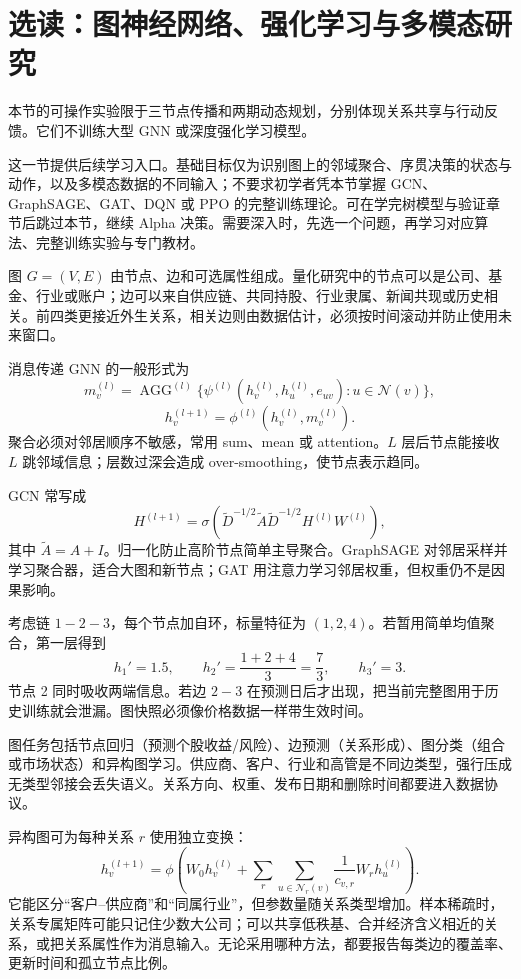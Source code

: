 \section{选读：图神经网络、强化学习与多模态研究}
\label{ch:lower-ml-frontiers}

本节的可操作实验限于三节点传播和两期动态规划，分别体现关系共享与行动反馈。它们不训练大型 GNN 或深度强化学习模型。


这一节提供后续学习入口。基础目标仅为识别图上的邻域聚合、序贯决策的状态与动作，以及多模态数据的不同输入；不要求初学者凭本节掌握 GCN、GraphSAGE、GAT、DQN 或 PPO 的完整训练理论。可在学完树模型与验证章节后跳过本节，继续 Alpha 决策。需要深入时，先选一个问题，再学习对应算法、完整训练实验与专门教材。


图 $G=(V,E)$ 由节点、边和可选属性组成。量化研究中的节点可以是公司、基金、行业或账户；边可以来自供应链、共同持股、行业隶属、新闻共现或历史相关。前四类更接近外生关系，相关边则由数据估计，必须按时间滚动并防止使用未来窗口。



消息传递 GNN 的一般形式为
\[
m_v^{(l)}=\operatorname{AGG}^{(l)}
\{\psi^{(l)}(h_v^{(l)},h_u^{(l)},e_{uv}):u\in\mathcal N(v)\},
\]
\[
h_v^{(l+1)}=\phi^{(l)}(h_v^{(l)},m_v^{(l)}).
\]
聚合必须对邻居顺序不敏感，常用 sum、mean 或 attention。$L$ 层后节点能接收 $L$ 跳邻域信息；层数过深会造成 over-smoothing，使节点表示趋同。


GCN 常写成
\[
H^{(l+1)}=\sigma\!\left(
\tilde D^{-1/2}\tilde A\tilde D^{-1/2}H^{(l)}W^{(l)}
\right),
\]
其中 $\tilde A=A+I$。归一化防止高阶节点简单主导聚合。GraphSAGE 对邻居采样并学习聚合器，适合大图和新节点；GAT 用注意力学习邻居权重，但权重仍不是因果影响。


考虑链 $1-2-3$，每个节点加自环，标量特征为 $(1,2,4)$。若暂用简单均值聚合，第一层得到
\[
h_1'=1.5,\qquad h_2'=\frac{1+2+4}{3}=\frac73,
\qquad h_3'=3.
\]
节点 2 同时吸收两端信息。若边 $2-3$ 在预测日后才出现，把当前完整图用于历史训练就会泄漏。图快照必须像价格数据一样带生效时间。

图任务包括节点回归（预测个股收益/风险）、边预测（关系形成）、图分类（组合或市场状态）和异构图学习。供应商、客户、行业和高管是不同边类型，强行压成无类型邻接会丢失语义。关系方向、权重、发布日期和删除时间都要进入数据协议。

异构图可为每种关系 $r$ 使用独立变换：
\[
h_v^{(l+1)}=\phi\!\left(
W_0h_v^{(l)}+\sum_r\sum_{u\in\mathcal N_r(v)}
\frac{1}{c_{v,r}}W_rh_u^{(l)}
\right).
\]
它能区分“客户--供应商”和“同属行业”，但参数量随关系类型增加。样本稀疏时，关系专属矩阵可能只记住少数大公司；可以共享低秩基、合并经济含义相近的关系，或把关系属性作为消息输入。无论采用哪种方法，都要报告每类边的覆盖率、更新时间和孤立节点比例。

